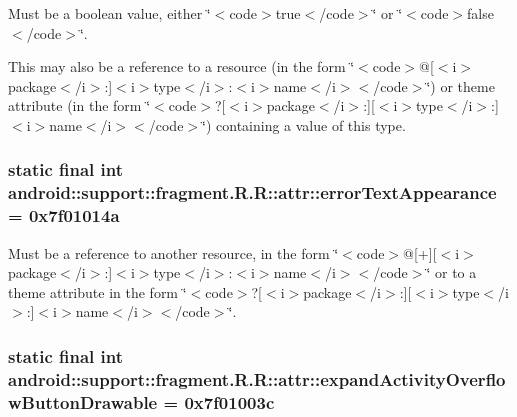 Must be a boolean value, either \char`\"{}$<$code$>$true$<$/code$>$\char`\"{} or \char`\"{}$<$code$>$false$<$/code$>$\char`\"{}. 

This may also be a reference to a resource (in the form \char`\"{}$<$code$>$@\mbox{[}$<$i$>$package$<$/i$>$:\mbox{]}$<$i$>$type$<$/i$>$:$<$i$>$name$<$/i$>$$<$/code$>$\char`\"{}) or theme attribute (in the form \char`\"{}$<$code$>$?\mbox{[}$<$i$>$package$<$/i$>$:\mbox{]}\mbox{[}$<$i$>$type$<$/i$>$:\mbox{]}$<$i$>$name$<$/i$>$$<$/code$>$\char`\"{}) containing a value of this type. \hypertarget{classandroid_1_1support_1_1fragment_1_1_r_1_1attr_9dae324a8331d265fb076c5950a35c4f}{
\subsubsection[{errorTextAppearance}]{\setlength{\rightskip}{0pt plus 5cm}static final int android::support::fragment.R.R::attr::errorTextAppearance = 0x7f01014a}}
\label{classandroid_1_1support_1_1fragment_1_1_r_1_1attr_9dae324a8331d265fb076c5950a35c4f}


Must be a reference to another resource, in the form \char`\"{}$<$code$>$@\mbox{[}+\mbox{]}\mbox{[}$<$i$>$package$<$/i$>$:\mbox{]}$<$i$>$type$<$/i$>$:$<$i$>$name$<$/i$>$$<$/code$>$\char`\"{} or to a theme attribute in the form \char`\"{}$<$code$>$?\mbox{[}$<$i$>$package$<$/i$>$:\mbox{]}\mbox{[}$<$i$>$type$<$/i$>$:\mbox{]}$<$i$>$name$<$/i$>$$<$/code$>$\char`\"{}. \hypertarget{classandroid_1_1support_1_1fragment_1_1_r_1_1attr_3906c4f0b44d543230a564bfd680ff5c}{
\subsubsection[{expandActivityOverflowButtonDrawable}]{\setlength{\rightskip}{0pt plus 5cm}static final int android::support::fragment.R.R::attr::expandActivityOverflowButtonDrawable = 0x7f01003c}}
\label{classandroid_1_1support_1_1fragment_1_1_r_1_1attr_3906c4f0b44d543230a564bfd680ff5c}


